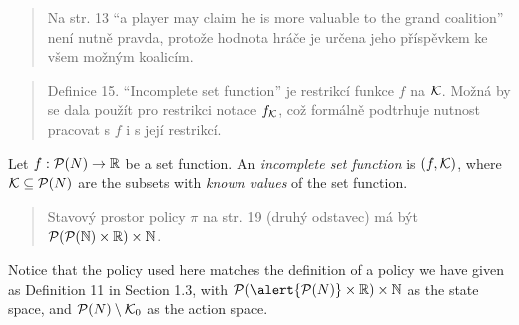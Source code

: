 \documentclass[aspectratio=169]{beamer}
\begin{document}
\begin{frame}
	\begin{quote}
		Na str. 13 “a player may claim he is more valuable to the grand coalition” není nutně pravda, protože hodnota hráče je určena jeho příspěvkem ke všem možným koalicím.
	\end{quote}
\end{frame}

\begin{frame}
	\begin{quote}
		Definice 15. “Incomplete set function” je restrikcí funkce $ f $ na $ \mathcal{K} $. Možná by se dala použít pro restrikci notace $ f_{\mathcal{K}} $, což formálně podtrhuje nutnost pracovat s $ f $ i s její restrikcí.
	\end{quote}

	\vspace{2em}
	\begin{definition}
		Let $ f: \mathcal{P}\!\left(N\right) \to \mathbb{R} $ be a set function.
		An \emph{incomplete set function} is $ \left( f, \mathcal{K} \right) $, where $ \mathcal{K} \subseteq \mathcal{P}\!\left(N\right) $ are the subsets with \emph{known values} of the set function.
	\end{definition}
\end{frame}

\begin{frame}
	\begin{quote}
		Stavový prostor policy $ \pi $ na str. 19 (druhý odstavec) má být $ \mathcal{P}\!\left(\mathcal{P}\!\left(\mathbb{N}\right) \times \mathbb{R}\right) \times \mathbb{N} $.
	\end{quote}
	\vspace{2em}
	Notice that the policy used here matches the definition of a policy we have given as Definition 11 in Section 1.3, with $ \pot {\alert{\pot N} \times \R} \times \N $ as the state space, and $ \mathcal{P}\!\left(N\right) \setminus \mathcal{K}_0 $ as the action space.
\end{frame}
\end{document}
